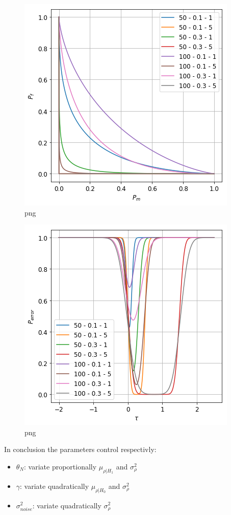 \begin{figure}
\centering
\includegraphics{output_10_0.png}
\caption{png}
\end{figure}

\begin{figure}
\centering
\includegraphics{output_10_1.png}
\caption{png}
\end{figure}

In conclusion the parameters control respectivly:

\begin{itemize}
\tightlist
\item
  \(\theta_N\): variate proportionally \(\mu_{\rho|H_1}\) and
  \(\sigma_\rho^2\)
\item
  \(\gamma\): variate quadratically \(\mu_{\rho|H_0}\) and
  \(\sigma_\rho^2\)
\item
  \(\sigma^2_{noise}\): variate quadratically \(\sigma_\rho^2\)
\end{itemize}

